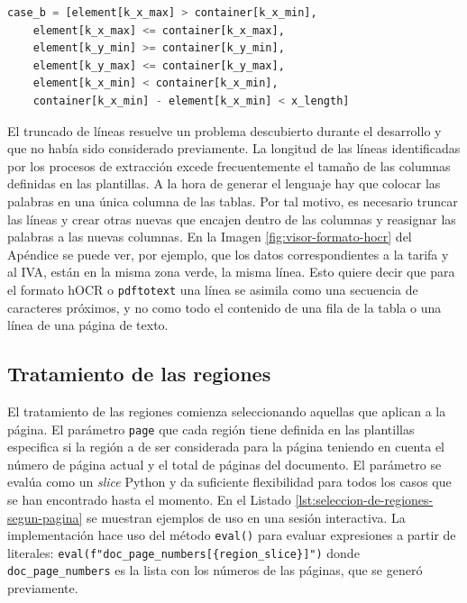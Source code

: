 \begin{lstlisting}[language=Python,caption={Evaluación de las condiciones del Caso B},label=lst:condiciones-caso-b]
    case_b = [element[k_x_max] > container[k_x_min],
    element[k_x_max] <= container[k_x_max],
    element[k_y_min] >= container[k_y_min],
    element[k_y_max] <= container[k_y_max],
    element[k_x_min] < container[k_x_min],
    container[k_x_min] - element[k_x_min] < x_length]
\end{lstlisting}

El truncado de líneas resuelve un problema descubierto durante el desarrollo y que no había sido considerado previamente. La longitud de las líneas identificadas por los procesos de extracción excede frecuentemente el tamaño de las columnas definidas en las plantillas. A la hora de generar el lenguaje hay que colocar las palabras en una única columna de las tablas. Por tal motivo, es necesario truncar las líneas y crear otras nuevas que encajen dentro de las columnas y reasignar las palabras a las nuevas columnas. En la Imagen \ref{fig:visor-formato-hocr} del Apéndice se puede ver, por ejemplo, que los datos correspondientes a la tarifa y al IVA, están en la misma zona verde, la misma línea. Esto quiere decir que para el formato hOCR o \verb|pdftotext| una línea se asimila como una secuencia de caracteres próximos, y no como todo el contenido de una fila de la tabla o una línea de una página de texto.


\subsection{Tratamiento de las regiones}

El tratamiento de las regiones comienza seleccionando aquellas que aplican a la página. El parámetro \verb|page| que cada región tiene definida en las plantillas especifica si la región a de ser considerada para la página teniendo en cuenta el número de página actual y el total de páginas del documento. El parámetro se evalúa como un \emph{slice} Python y da suficiente flexibilidad para todos los casos que se han encontrado hasta el momento. En el Listado \ref{lst:seleccion-de-regiones-segun-pagina} se muestran ejemplos de uso en una sesión interactiva. La implementación hace uso del método \verb|eval()| para evaluar expresiones a partir de literales: \verb|eval(f"doc_page_numbers[{region_slice}]")| donde \verb|doc_page_numbers| es la lista con los números de las páginas, que se generó previamente.

